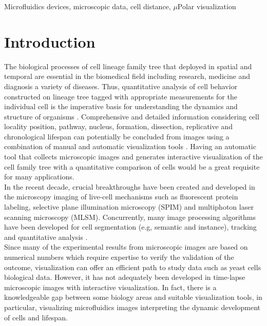 \documentclass[conference]{IEEEtran}
\begin{document}
\begin{IEEEkeywords}
Microfluidics devices, microscopic data, cell distance, $\mu$Polar visualization 
\end{IEEEkeywords}

\section{Introduction}
 
The biological processes of cell lineage family tree that deployed in spatial and temporal are essential in the biomedical field including research, medicine and diagnosis a variety of diseases. Thus, quantitative analysis of cell behavior constructed on lineage tree tagged with appropriate measurements for the individual cell is the imperative basis for understanding the dynamics and structure of organisms \cite{r2.6}. Comprehensive and detailed information considering cell locality position, pathway, nucleus, formation, dissection, replicative and chronological lifespan can potentially be concluded from images using a combination of manual and automatic visualization tools \cite{r2.7}. Having an automatic tool that collects microscopic images and generates interactive visualization of the cell family tree with a quantitative comparison of cells would be a great requisite for many applications.\\

In the recent decade, crucial breakthroughs have been created and developed in the microscopy imaging of live-cell mechanisms such as fluorescent protein labeling, selective plane illumination microscopy (SPIM) and multiphoton laser scanning microscopy (MLSM)\cite{r2.7,r2.8}. Concurrently, many image processing algorithms have been developed for cell segmentation (e.g, semantic and instance), tracking and quantitative analysis \cite{r2.10}.\\


Since many of the experimental results from microscopic images are based on numerical numbers which require expertise to verify the validation of the outcome, visualization can offer an efficient path to study data such as yeast cells biological data. However, it has not adequately been developed in time-lapse microscopic images with interactive visualization. In fact, there is a knowledgeable gap between some biology areas and suitable visualization tools, in particular, visualizing microfluidics images interpreting the dynamic development of cells and lifespan. 
\end{document}
